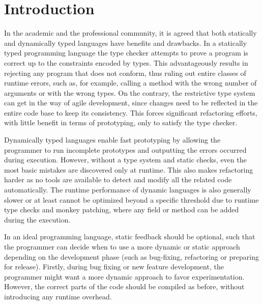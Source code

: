  \section{Introduction}

In the academic and the professional community, it is agreed that both statically and dynamically typed languages have benefits and drawbacks. In a statically typed programming language the type checker attempts to prove a program is correct up to the constraints encoded by types.
This advantageously results in rejecting any program that does not conform, thus ruling out entire classes of runtime errors, such as, for example, calling a method with the wrong number of arguments or with the wrong types. On the contrary, the restrictive type system can get in the way of agile development, since changes need to be reflected in the entire code base to keep its consistency. This forces significant refactoring efforts, with little benefit in terms of prototyping, only to satisfy the type checker.

 Dynamically typed languages enable fast prototyping by allowing the programmer to run incomplete prototypes and outputting the errors occurred during execution. However, without a type system and static checks, even the most basic mistakes are discovered only at runtime. This also makes refactoring harder as no tools are available to detect and modify all the related code automatically. The runtime performance of dynamic languages is also generally slower or at least cannot be optimized beyond a specific threshold due to runtime type checks and monkey patching, where any field or method can be added during the execution.


In an ideal programming language, static feedback should be optional, such that the programmer can decide when to use a more dynamic or static approach depending on the development phase (such as bug-fixing, refactoring or preparing for release). Firstly, during bug fixing or new feature development, the programmer might want a more dynamic approach to favor experimentation. However, the correct parts of the code should be compiled as before, without introducing any runtime overhead.

